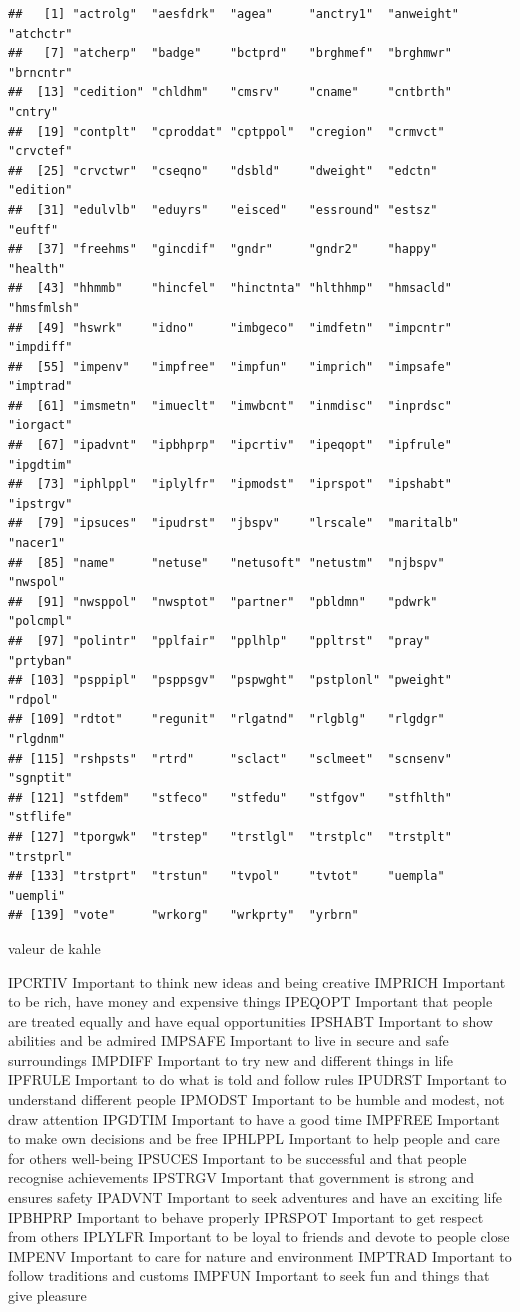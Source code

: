 \documentclass[
]{book}
\begin{document}
\begin{verbatim}
##   [1] "actrolg"  "aesfdrk"  "agea"     "anctry1"  "anweight" "atchctr" 
##   [7] "atcherp"  "badge"    "bctprd"   "brghmef"  "brghmwr"  "brncntr" 
##  [13] "cedition" "chldhm"   "cmsrv"    "cname"    "cntbrth"  "cntry"   
##  [19] "contplt"  "cproddat" "cptppol"  "cregion"  "crmvct"   "crvctef" 
##  [25] "crvctwr"  "cseqno"   "dsbld"    "dweight"  "edctn"    "edition" 
##  [31] "edulvlb"  "eduyrs"   "eisced"   "essround" "estsz"    "euftf"   
##  [37] "freehms"  "gincdif"  "gndr"     "gndr2"    "happy"    "health"  
##  [43] "hhmmb"    "hincfel"  "hinctnta" "hlthhmp"  "hmsacld"  "hmsfmlsh"
##  [49] "hswrk"    "idno"     "imbgeco"  "imdfetn"  "impcntr"  "impdiff" 
##  [55] "impenv"   "impfree"  "impfun"   "imprich"  "impsafe"  "imptrad" 
##  [61] "imsmetn"  "imueclt"  "imwbcnt"  "inmdisc"  "inprdsc"  "iorgact" 
##  [67] "ipadvnt"  "ipbhprp"  "ipcrtiv"  "ipeqopt"  "ipfrule"  "ipgdtim" 
##  [73] "iphlppl"  "iplylfr"  "ipmodst"  "iprspot"  "ipshabt"  "ipstrgv" 
##  [79] "ipsuces"  "ipudrst"  "jbspv"    "lrscale"  "maritalb" "nacer1"  
##  [85] "name"     "netuse"   "netusoft" "netustm"  "njbspv"   "nwspol"  
##  [91] "nwsppol"  "nwsptot"  "partner"  "pbldmn"   "pdwrk"    "polcmpl" 
##  [97] "polintr"  "pplfair"  "pplhlp"   "ppltrst"  "pray"     "prtyban" 
## [103] "psppipl"  "psppsgv"  "pspwght"  "pstplonl" "pweight"  "rdpol"   
## [109] "rdtot"    "regunit"  "rlgatnd"  "rlgblg"   "rlgdgr"   "rlgdnm"  
## [115] "rshpsts"  "rtrd"     "sclact"   "sclmeet"  "scnsenv"  "sgnptit" 
## [121] "stfdem"   "stfeco"   "stfedu"   "stfgov"   "stfhlth"  "stflife" 
## [127] "tporgwk"  "trstep"   "trstlgl"  "trstplc"  "trstplt"  "trstprl" 
## [133] "trstprt"  "trstun"   "tvpol"    "tvtot"    "uempla"   "uempli"  
## [139] "vote"     "wrkorg"   "wrkprty"  "yrbrn"
\end{verbatim}

valeur de kahle

IPCRTIV Important to think new ideas and being creative
IMPRICH Important to be rich, have money and expensive things
IPEQOPT Important that people are treated equally and have equal opportunities
IPSHABT Important to show abilities and be admired
IMPSAFE Important to live in secure and safe surroundings
IMPDIFF Important to try new and different things in life
IPFRULE Important to do what is told and follow rules
IPUDRST Important to understand different people
IPMODST Important to be humble and modest, not draw attention
IPGDTIM Important to have a good time
IMPFREE Important to make own decisions and be free
IPHLPPL Important to help people and care for others well-being
IPSUCES Important to be successful and that people recognise achievements
IPSTRGV Important that government is strong and ensures safety
IPADVNT Important to seek adventures and have an exciting life
IPBHPRP Important to behave properly
IPRSPOT Important to get respect from others
IPLYLFR Important to be loyal to friends and devote to people close
IMPENV Important to care for nature and environment
IMPTRAD Important to follow traditions and customs
IMPFUN Important to seek fun and things that give pleasure
\end{document}
